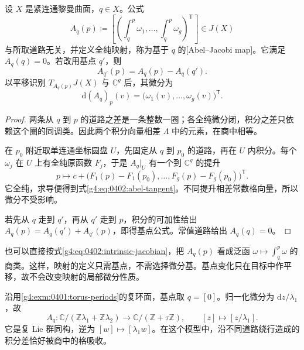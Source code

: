 \begin{proposition}
	\label{g4:prop:0402:abel-jacobi}
	设 \(X\) 是紧连通黎曼曲面，\(q\in X\)。公式
	\begin{equation}\label{g4:eq:0402:abel-jacobi}
		A_q(p)\coloneqq
		\left[\left(\int_q^p\omega_1,\ldots,\int_q^p\omega_g\right)^{\mathsf T}\right]
		\in J(X)
	\end{equation}
	与所取道路无关，并定义全纯映射，称为基于 \(q\) 的[Abel--Jacobi map]。它满足 \(A_q(q)=0\)。若改用基点 \(q'\)，则
	\begin{equation}\label{g4:eq:0402:basepoint-change}
		A_{q'}(p)=A_q(p)-A_q(q').
	\end{equation}
	以平移识别 \(T_{A_q(p)}J(X)\) 与 \(\mathbb C^g\) 后，其微分为
	\begin{equation}\label{g4:eq:0402:abel-tangent}
		\mathrm{d}(A_q)_p(v)
		=\bigl(\omega_1(v),\ldots,\omega_g(v)\bigr)^{\mathsf T}.
	\end{equation}
\end{proposition}
\begin{proof}
	两条从 \(q\) 到 \(p\) 的道路之差是一条整数一圈；各全纯微分闭，积分之差只依赖这个圈的同调类。因此两个积分向量相差 \(\Lambda\) 中的元素，在商中相等。

	在 \(p_0\) 附近取单连通坐标圆盘 \(U\)，先固定从 \(q\) 到 \(p_0\) 的道路，再在 \(U\) 内积分。每个 \(\omega_j\) 在 \(U\) 上有全纯原函数 \(F_j\)，于是 \(A_q|_U\) 有一个到 \(\mathbb C^g\) 的提升
	\[
		p\longmapsto c+
		\bigl(F_1(p)-F_1(p_0),\ldots,F_g(p)-F_g(p_0)\bigr)^{\mathsf T}.
	\]
	它全纯，求导便得到式\eqref{g4:eq:0402:abel-tangent}。不同提升相差常数格向量，所以微分不受影响。

	若先从 \(q\) 走到 \(q'\)，再从 \(q'\) 走到 \(p\)，积分的可加性给出
	\(A_q(p)=A_q(q')+A_{q'}(p)\)，即得基点公式。常值道路给出 \(A_q(q)=0\)。
\end{proof}

也可以直接按式\eqref{g4:eq:0402:intrinsic-jacobian}，把 \(A_q(p)\) 看成泛函 \(\omega\mapsto\int_q^p\omega\) 的商类。这样，映射的定义只需基点，不需选择微分基。基点变化只在目标中作平移，故不会改变映射的局部微分性质。

\begin{example}
	\label{g4:exm:0402:torus-abel}
	沿用\cref{g4:exm:0401:torus-periods}的复环面，基点取 \(q=[0]\)。归一化微分为 \(\mathrm{d}z/\lambda_1\)，故
	\[
		A_q:\mathbb C/(\mathbb Z\lambda_1+\mathbb Z\lambda_2)
		\longrightarrow\mathbb C/(\mathbb Z+\tau\mathbb Z),
		\qquad [z]\longmapsto[z/\lambda_1].
	\]
	它是复 Lie 群同构，逆为 \([w]\mapsto[\lambda_1w]\)。在这个模型中，沿不同道路绕行造成的积分差恰好被商中的格吸收。
\end{example}

